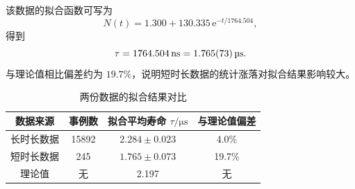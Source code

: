 \documentclass[12pt,a4paper]{article}
\begin{document}
该数据的拟合函数可写为
\begin{equation}
    N(t)=1.300+130.335\,\mathrm{e}^{-t/1764.504},
\end{equation}
得到
\begin{equation}
    \tau = \SI{1764.504}{\nano\second} = \SI{1.765\pm0.073}{\micro\second}.
\end{equation}
与理论值相比偏差约为 $19.7\%$，说明短时长数据的统计涨落对拟合结果影响较大。

\begin{table}[htbp]
\centering
\caption{两份数据的拟合结果对比}
\begin{tabular}{cccc}
\toprule
数据来源 & 事例数 & 拟合平均寿命 $\tau / \si{\micro\second}$ & 与理论值偏差 \\
\midrule
长时长数据 & 15892 & $2.284\pm0.023$ & 4.0\% \\
短时长数据 & 245 & $1.765\pm0.073$ & 19.7\% \\
理论值 & 无 & 2.197 & 无 \\
\bottomrule
\end{tabular}
\end{table}
\end{document}
